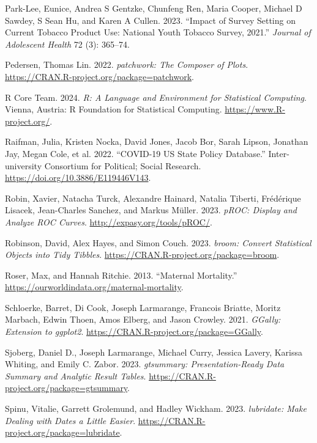 \documentclass[
  letterpaper,
]{latex/krantz}
\newlength{\cslhangindent}
\newenvironment{CSLReferences}[2] %
 {\begin{list}{}{%
  \setlength{\itemindent}{0pt}
  \setlength{\leftmargin}{0pt}
  \setlength{\parsep}{0pt}
  \ifodd #1
   \setlength{\leftmargin}{\cslhangindent}
   \setlength{\itemindent}{-1\cslhangindent}
  \fi
  \setlength{\itemsep}{#2\baselineskip}}}
 {\end{list}}
\begin{document}
\begin{CSLReferences}{1}{0}
Park-Lee, Eunice, Andrea S Gentzke, Chunfeng Ren, Maria Cooper, Michael
D Sawdey, S Sean Hu, and Karen A Cullen. 2023. {``Impact of Survey
Setting on Current Tobacco Product Use: National Youth Tobacco Survey,
2021.''} \emph{Journal of Adolescent Health} 72 (3): 365--74.

Pedersen, Thomas Lin. 2022. \emph{{patchwork: The Composer of Plots}}.
\url{https://CRAN.R-project.org/package=patchwork}.

R Core Team. 2024. \emph{R: A Language and Environment for Statistical
Computing}. Vienna, Austria: R Foundation for Statistical Computing.
\url{https://www.R-project.org/}.

Raifman, Julia, Kristen Nocka, David Jones, Jacob Bor, Sarah Lipson,
Jonathan Jay, Megan Cole, et al. 2022. {``{COVID-19 US State Policy
Database}.''} Inter-university Consortium for Political; Social
Research. \url{https://doi.org/10.3886/E119446V143}.

Robin, Xavier, Natacha Turck, Alexandre Hainard, Natalia Tiberti,
Frédérique Lisacek, Jean-Charles Sanchez, and Markus Müller. 2023.
\emph{pROC: Display and Analyze ROC Curves}.
\url{http://expasy.org/tools/pROC/}.

Robinson, David, Alex Hayes, and Simon Couch. 2023. \emph{{broom:
Convert Statistical Objects into Tidy Tibbles}}.
\url{https://CRAN.R-project.org/package=broom}.

Roser, Max, and Hannah Ritchie. 2013. {``Maternal Mortality.''}
\url{https://ourworldindata.org/maternal-mortality}.

Schloerke, Barret, Di Cook, Joseph Larmarange, Francois Briatte, Moritz
Marbach, Edwin Thoen, Amos Elberg, and Jason Crowley. 2021.
\emph{{GGally: Extension to ggplot2}}.
\url{https://CRAN.R-project.org/package=GGally}.

Sjoberg, Daniel D., Joseph Larmarange, Michael Curry, Jessica Lavery,
Karissa Whiting, and Emily C. Zabor. 2023. \emph{{gtsummary:
Presentation-Ready Data Summary and Analytic Result Tables}}.
\url{https://CRAN.R-project.org/package=gtsummary}.

Spinu, Vitalie, Garrett Grolemund, and Hadley Wickham. 2023.
\emph{{lubridate: Make Dealing with Dates a Little Easier}}.
\url{https://CRAN.R-project.org/package=lubridate}.


\end{CSLReferences}
\end{document}
